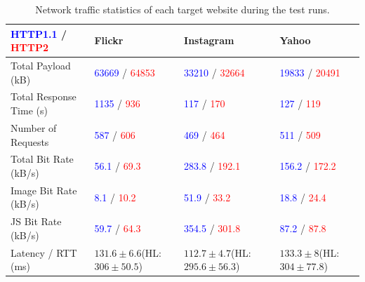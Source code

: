\documentclass{article}
\begin{document}
\begin{table}
    \caption{Network traffic statistics of each target website during the test runs.}
    \label{}
    \begin{tabular}{|l|K{2.6cm}|K{2.8cm}|K{2.5cm}|}
        \hline
        \textcolor{blue}{HTTP1.1} / \textcolor{red}{HTTP2} & \textbf{Flickr} & \textbf{Instagram} & \textbf{Yahoo} \\ \hline
        Total Payload (kB) & \textcolor{blue}{63669} / \textcolor{red}{64853}  & \textcolor{blue}{33210} / \textcolor{red}{32664}  &
        \textcolor{blue}{19833} / \textcolor{red}{20491}  \\ \hline
        Total Response Time (s) & \textcolor{blue}{1135} / \textcolor{red}{936}  &\textcolor{blue}{117} / \textcolor{red}{170}  &
        \textcolor{blue}{127} / \textcolor{red}{119}  \\ \hline

        Number of Requests & \textcolor{blue}{587} / \textcolor{red}{606} & \textcolor{blue}{469} / \textcolor{red}{464} & \textcolor{blue}{511} / \textcolor{red}{509} \\ \hline

        Total Bit Rate (kB/s) & \textcolor{blue}{56.1} / \textcolor{red}{69.3} & \textcolor{blue}{283.8} / \textcolor{red}{192.1} & \textcolor{blue}{156.2} / \textcolor{red}{172.2} \\  \hline

        Image Bit Rate (kB/s) & \textcolor{blue}{8.1} / \textcolor{red}{10.2} &\textcolor{blue}{51.9} / \textcolor{red}{33.2}  & \textcolor{blue}{18.8} / \textcolor{red}{24.4}  \\ \hline

        JS Bit Rate (kB/s) & \textcolor{blue}{59.7} / \textcolor{red}{64.3} &\textcolor{blue}{354.5} / \textcolor{red}{301.8}  & \textcolor{blue}{87.2} / \textcolor{red}{87.8}  \\ \hline

        Latency / RTT (ms) & $131.6\pm6.6$\newline(HL: $306\pm50.5$)    & $112.7\pm4.7$\newline(HL: $295.6\pm56.3$) & $133.3\pm8$\newline(HL: $304\pm77.8$) \\ \hline
    \end{tabular}
\end{table}
\end{document}
